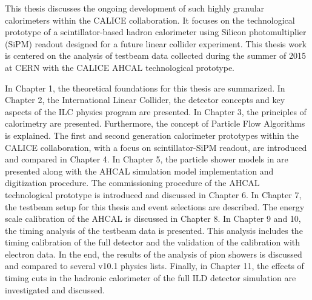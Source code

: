 This thesis discusses the ongoing development of such highly granular calorimeters within the CALICE collaboration. It focuses on the technological prototype of a scintillator-based hadron calorimeter using Silicon photomultiplier (SiPM) readout designed for a future linear collider experiment. This thesis work is centered on the analysis of testbeam data collected during the summer of 2015 at CERN with the CALICE AHCAL technological prototype.

In Chapter 1, the theoretical foundations for this thesis are summarized. In Chapter 2, the International Linear Collider, the detector concepts and key aspects of the ILC physics program are presented. In Chapter 3, the principles of calorimetry are presented. Furthermore, the concept of Particle Flow Algorithms is explained. The first and second generation calorimeter prototypes within the CALICE collaboration, with a focus on scintillator-SiPM readout, are introduced and compared in Chapter 4. In Chapter 5, the particle shower models in \geant are presented along with the AHCAL simulation model implementation and digitization procedure. The commissioning procedure of the AHCAL technological prototype is introduced and discussed in Chapter 6. In Chapter 7, the testbeam setup for this thesis and event selections are described. The energy scale calibration of the AHCAL is discussed in Chapter 8. In Chapter 9 and 10, the timing analysis of the testbeam data is presented. This analysis includes the timing calibration of the full detector and the validation of the calibration with electron data. In the end, the results of the analysis of pion showers is discussed and compared to several \geant v10.1 physics lists. Finally, in Chapter 11, the effects of timing cuts in the hadronic calorimeter of the full ILD detector simulation are investigated and discussed.
